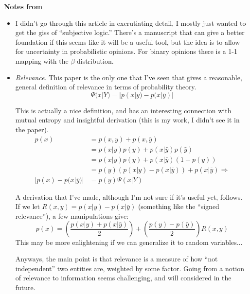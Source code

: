 \documentclass{article}
\newcommand{\note}[1]{{\footnotesize #1}}
\newcommand{\hi}[1]{{\large {\bf #1}}}
\newcommand{\hii}[1]{{\it #1}}
\begin{document}
\hi{Notes from \cite{josang16}}

\begin{itemize}

    \item I didn't go through this article in excrutiating detail, I mostly just wanted to get the giss of ``subjective logic.''  There's a manuscript that can give a better foundation if this seems like it will be a useful tool, but the idea is to allow for uncertainty in probabilistic opinions.  For binary opinions there is a 1-1 mapping with the $\beta$-distribution.

    \item \hii{Relevance.}  This paper is the only one that I've seen that gives a reasonable, general definition of relevance in terms of probability theory.
    \[ \Psi(x|Y) = |p(x|y) - p(x|\bar y)| \]

    This is actually a nice definition, and has an interesting connection with mutual entropy and insightful derivation \note{(this is my work, I didn't see it in the paper)}.
    \begin{align*}
    p(x) & = p(x,y) + p(x,\bar y) \\
         & = p(x|y)p(y) + p(x|\bar y)p(\bar y) \\
         & = p(x|y)p(y) + p(x|\bar y)(1-p(y)) \\
         & = p(y)(p(x|y) - p(x|\bar y)) + p(x|\bar y) \Rightarrow \\
    |p(x) - p(x|\bar y)| & = p(y)\Psi(x|Y)
    \end{align*}

    A derivation that I've made, although I'm not sure if it's useful yet, follows.  If we let $R(x,y) = p(x|y)-p(x|\bar y)$ (something like the ``signed relevance''), a few manipulations give:
    \[ p(x) = \left(\frac{p(x|y) + p(x|\bar y)}{2}\right) + \left(\frac{p(y)-p(\bar y)}{2}\right)R(x,y) \]
    This may be more enlightening if we can generalize it to random variables...

    Anyways, the main point is that relevance is a measure of how ``not independent'' two entities are, weighted by some factor.  Going from a notion of relevance to information seems challenging, and will considered in the future.


\end{itemize}

%
\end{document}
